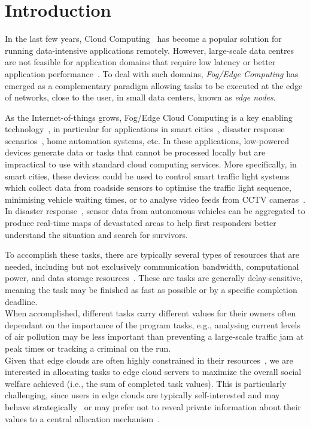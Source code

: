 \section{Introduction}
\label{sec:introduction}
In the last few years, Cloud Computing~\cite{cloud_cite} has become a popular solution for running data-intensive
applications remotely. However, large-scale data centres are not feasible for application domains that require low
latency or better application performance~\cite{mobile_edge_IoT}. To deal with such domains, \emph{Fog/Edge Computing}
has emerged as a complementary paradigm allowing tasks to be executed at the edge of networks, close to the user, in
small data centers, known as \emph{edge nodes}.

As the Internet-of-things grows, Fog/Edge Cloud Computing is a key enabling
technology~\cite{mobile_edge_IoT, edge_computing_iot}, in particular for applications
in smart cities~\cite{mobile_edge_smart}, disaster response scenarios~\cite{mobile_edge_disaster, smart_disaster_management},
home automation systems, etc. In these applications, low-powered devices generate data or tasks that cannot be
processed locally but are impractical to use with standard cloud computing services. More specifically, in smart cities,
these devices could be used to control smart traffic light systems~\cite{smart_cities_traffic_lights} which collect
data from roadside sensors to optimise the traffic light sequence, minimising vehicle waiting times, or to analyse
video feeds from CCTV cameras~\cite{Sreenu2019}. In disaster response~\cite{smart_disaster_management}, sensor data
from autonomous vehicles can be aggregated to produce real-time maps of devastated areas to help first responders better
understand the situation and search for survivors.

To accomplish these tasks, there are typically several types of resources that are needed, including but not exclusively
communication bandwidth, computational power, and data storage resources~\cite{vaji_infocom}. These are tasks are
generally delay-sensitive, meaning the task may be finished as fast as possible or by a specific completion deadline. \\
When accomplished, different tasks carry different values for their owners often dependant on the importance of the
program tasks, e.g., analysing current levels of air pollution may be less important than preventing a large-scale
traffic jam at peak times or tracking a criminal on the run. \\
Given that edge clouds are often highly constrained in their resources~\cite{edge_limitations}, we are interested in
allocating tasks to edge cloud servers to maximize the overall social welfare achieved (i.e., the sum of completed task
values). This is particularly challenging, since users in edge clouds are typically self-interested and may behave
strategically~\cite{Bi2019} or may prefer not to reveal private information about their values to a central allocation
mechanism~\cite{Pai2013}.

